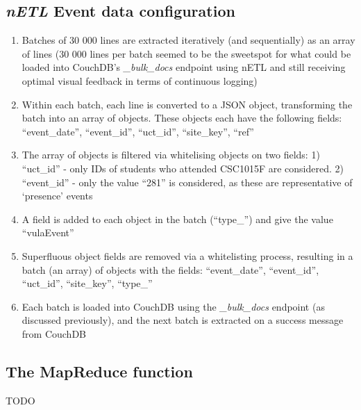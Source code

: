\subsection*{\textit{nETL} Event data configuration}
\begin{enumerate}
    \item Batches of 30 000 lines are extracted iteratively (and sequentially) as an array of lines (30 000 lines per batch seemed to be the sweetspot for what could be loaded into CouchDB's \textit{\_bulk\_docs} endpoint using nETL and still receiving optimal visual feedback in terms of continuous logging)
    \item Within each batch, each line is converted to a JSON object, transforming the batch into an array of objects. These objects each have the following fields: ``event\_date'', ``event\_id'', ``uct\_id'',  ``site\_key'', ``ref''
    \item The array of objects is filtered via whitelising objects on two fields: 1) ``uct\_id'' - only IDs of students who attended CSC1015F are considered. 2) ``event\_id'' - only the value ``281'' is considered, as these are representative of `presence' events
    \item A field is added to each object in the batch (``type\_'') and give the value ``vulaEvent''
    \item Superfluous object fields are removed via a whitelisting process, resulting in a batch (an array) of objects with the fields: ``event\_date'', ``event\_id'', ``uct\_id'', ``site\_key'', ``type\_''
    \item Each batch is loaded into CouchDB using the \textit{\_bulk\_docs} endpoint (as discussed previously), and the next batch is extracted on a success message from CouchDB
\end{enumerate}


\subsection*{The MapReduce function}
TODO

